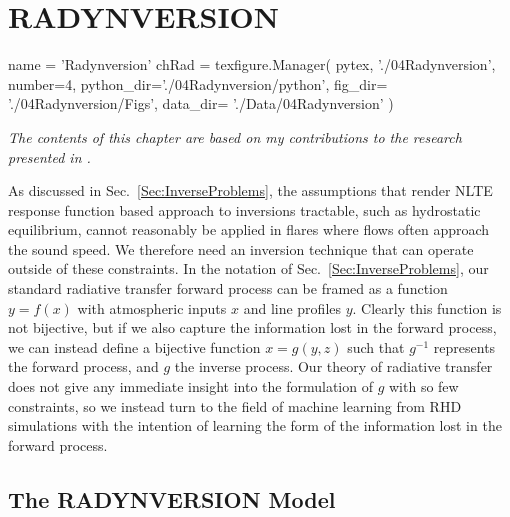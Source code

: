 \chapter{RADYNVERSION}\label{Chap:Radynversion}
\begin{pycode}[Radynversion]
name = 'Radynversion'
chRad = texfigure.Manager(
    pytex,
    './04Radynversion',
    number=4,
    python_dir='./04Radynversion/python',
    fig_dir=   './04Radynversion/Figs',
    data_dir=  './Data/04Radynversion'
)
\end{pycode}


\emph{The contents of this chapter are based on my contributions to the research presented in \citet{Osborne2019}.}

As discussed in Sec.~\ref{Sec:InverseProblems}, the assumptions that render NLTE response function based approach to inversions tractable, such as hydrostatic equilibrium, cannot reasonably be applied in flares where flows often approach the sound speed.
We therefore need an inversion technique that can operate outside of these constraints.
In the notation of Sec.~\ref{Sec:InverseProblems}, our standard radiative transfer forward process can be framed as a function $y = f(x)$ with atmospheric inputs $x$ and line profiles $y$.
Clearly this function is not bijective, but if we also capture the information lost in the forward process, we can instead define a bijective function $x = g(y, z)$ such that $g^{-1}$ represents the forward process, and $g$ the inverse process.
Our theory of radiative transfer does not give any immediate insight into the formulation of $g$ with so few constraints, so we instead turn to the field of machine learning from RHD simulations with the intention of learning the form of the information lost in the forward process.

\section{The RADYNVERSION Model}\label{Sec:RadynversionModel}

